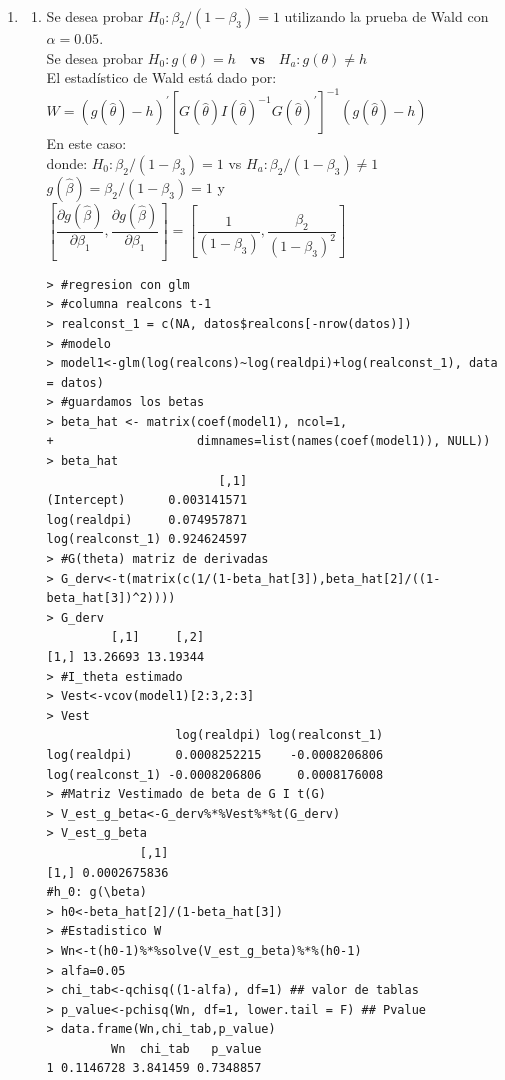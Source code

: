\documentclass[12pt,a4paper]{report}
\begin{document}
\begin{enumerate}
\item
\begin{enumerate}
\item Se desea probar $H_{0}: \beta_{2}/(1 -\beta_{3}) = 1$ utilizando la prueba de Wald con $\alpha = 0.05$.\\

Se desea probar $H_{0}:g(\theta)=h \quad \textbf{vs}\quad H_{a}:g(\theta)\neq h$\\


El estadístico de Wald está dado por: $W=(g(\hat{\theta})-h)^{\prime}[G(\hat{\theta})I(\hat{\theta})^{-1}G(\hat{\theta})^{\prime}]^{-1}(g(\hat{\theta})-h)$\\

En este caso:\\
donde: $H_{0}: \beta_{2}/(1 -\beta_{3}) = 1$ vs $H_{a}: \beta_{2}/(1 -\beta_{3}) \neq 1$\\

$g(\hat{\beta})=\beta_{2}/(1 -\beta_{3}) = 1$ y $\left[\dfrac{\partial g(\hat{\beta})}{\partial\beta_{1}},\dfrac{\partial g(\hat{\beta})}{\partial\beta_{1}}\right]=\left[\dfrac{1}{(1 -\beta_{3})},\dfrac{\beta_{2}}{(1 -\beta_{3})^{2}}\right]$

\begin{verbatim}
> #regresion con glm
> #columna realcons t-1
> realconst_1 = c(NA, datos$realcons[-nrow(datos)])
> #modelo
> model1<-glm(log(realcons)~log(realdpi)+log(realconst_1), data = datos)
> #guardamos los betas
> beta_hat <- matrix(coef(model1), ncol=1,
+                    dimnames=list(names(coef(model1)), NULL))
> beta_hat
                        [,1]
(Intercept)      0.003141571
log(realdpi)     0.074957871
log(realconst_1) 0.924624597
> #G(theta) matriz de derivadas
> G_derv<-t(matrix(c(1/(1-beta_hat[3]),beta_hat[2]/((1-beta_hat[3])^2))))
> G_derv
         [,1]     [,2]
[1,] 13.26693 13.19344
> #I_theta estimado
> Vest<-vcov(model1)[2:3,2:3]
> Vest
                  log(realdpi) log(realconst_1)
log(realdpi)      0.0008252215    -0.0008206806
log(realconst_1) -0.0008206806     0.0008176008
> #Matriz Vestimado de beta de G I t(G)
> V_est_g_beta<-G_derv%*%Vest%*%t(G_derv)
> V_est_g_beta
             [,1]
[1,] 0.0002675836
#h_0: g(\beta)
> h0<-beta_hat[2]/(1-beta_hat[3])
> #Estadistico W
> Wn<-t(h0-1)%*%solve(V_est_g_beta)%*%(h0-1)
> alfa=0.05
> chi_tab<-qchisq((1-alfa), df=1) ## valor de tablas 
> p_value<-pchisq(Wn, df=1, lower.tail = F) ## Pvalue
> data.frame(Wn,chi_tab,p_value)
         Wn  chi_tab   p_value
1 0.1146728 3.841459 0.7348857
\end{verbatim}


\end{enumerate}
\end{enumerate}
\end{document}
